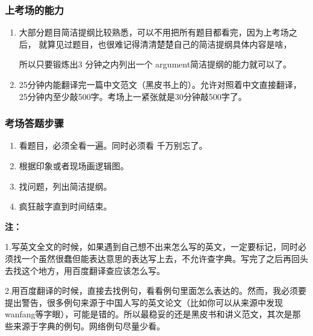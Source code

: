 \documentclass[11pt,a4paper]{article}
\begin{document}
{{{			\subsubsection*{上考场的能力}
			\begin{enumerate}
				\item	大部分题目简洁提纲比较熟悉，可以不用把所有题目都看完，因为上考场之后，	就算见过题目，也很难记得清清楚楚自己的简洁提纲具体内容是啥，\par 
				所以只要锻炼出3	分钟之内列出一个	argument简洁提纲的能力就可以了。
				
				\item 25分钟内能翻译完一篇中文范文（黑皮书上的）。允许对照着中文直接翻译，25分钟内至少敲500字。考场上一紧张就是30分钟敲500字了。
			\end{enumerate}
			\subsubsection*{考场答题步骤}
			\begin{enumerate}
				\item 看题目，必须全看一遍。同时必须看
					千万别忘了。
				\item 根据印象或者现场画逻辑图。
				\item 找问题，列出简洁提纲。
				\item 疯狂敲字直到时间结束。
			\end{enumerate}
			{\bfseries\Large 注：}
			
			1.写英文全文的时候，如果遇到自己想不出来怎么写的英文，一定要标记，同时必须找一个虽然很蠢但能表达意思的表达写上去，不允许查字典。写完了之后再回头去找这个地方，用百度翻译查应该怎么写。
			
			2.用百度翻译的时候，直接去找例句，看看例句里面怎么表达的。然而，我必须要提出警告，很多例句来源于中国人写的英文论文（比如你可以从来源中发现wanfang等字眼），可能是错的。所以最稳妥的还是黑皮书和讲义范文，其次是那些来源于字典的例句。网络例句尽量少看。
			
			{\LARGE\bfseries
			
			
			
}}}}
\end{document}
